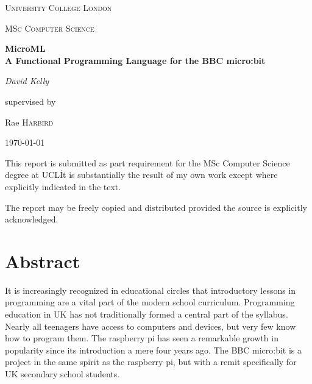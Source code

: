 \documentclass[12pt, a4paper]{report}
\begin{document}
\begin{titlepage}
    \centering
    {\scshape\LARGE University College London\par}
    \vspace{1cm}
    {\scshape\Large MSc Computer Science\par}
    \vspace{1.5cm}
    {\huge\bfseries MicroML \\ A Functional Programming Language for the BBC micro:bit \par}
    \vspace{2cm}
    {\huge\itshape David Kelly\par}
    \vfill
    supervised by\par
    {\large Rae \textsc{Harbird}}

    \vfill
    {\large \today\par}

    \vfill

    This report is submitted as part requirement for the MSc Computer Science
    degree at UCL\. It is substantially the result of my own work except where 
    explicitly indicated in the text.
    
    \vfill

    The report may be freely copied and distributed provided the source is explicitly
    acknowledged.
\end{titlepage}

%

{\pagestyle{plain}
\tableofcontents
\cleardoublepage}

{\pagestyle{plain}
\listoffigures
\listoftables
\printglossaries
\cleardoublepage}


\thispagestyle{empty}
\chapter*{Abstract}
It is increasingly recognized in educational circles that introductory lessons in programming
are a vital part of the modern school curriculum. Programming education in UK has not traditionally
formed a central part of the syllabus. Nearly all teenagers have access to computers and devices, but very
few know how to program them. The raspberry pi has seen a remarkable growth in
popularity since its introduction a mere four years ago. The BBC micro:bit is a project in the
same spirit as the raspberry pi, but with a remit specifically for UK secondary school students.
\end{document}
